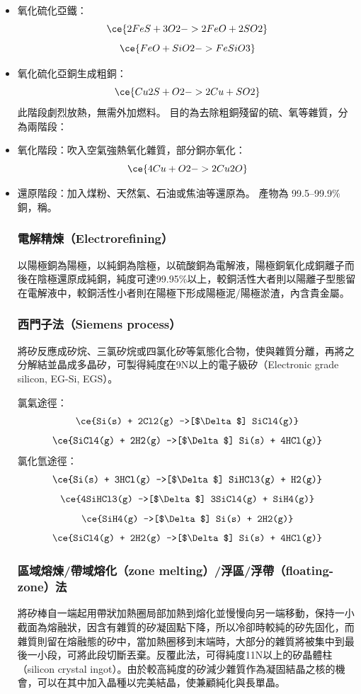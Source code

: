 \documentclass[a4paper,12pt]{report}
\begin{document}
\begin{itemize}
\begin{itemize}
在轉爐中吹入空氣強熱氧化冰銅，得到含 97–99\% 銅的與爐渣，反應有兩階段：
\ben
\item 氧化硫化亞鐵：
\[\ce{2FeS + 3O2 -> 2FeO + 2SO2}\]
\[\ce{FeO + SiO2 -> FeSiO3}\]
\item 氧化硫化亞銅生成粗銅：  
\[\ce{Cu2S + O2 -> 2Cu + SO2}\]
此階段劇烈放熱，無需外加燃料。
\een
{}
目的為去除粗銅殘留的硫、氧等雜質，分為兩階段：
\ben
\item 氧化階段：吹入空氣強熱氧化雜質，部分銅亦氧化：
\[\ce{4Cu + O2 -> 2Cu2O}\]
\item 還原階段：加入煤粉、天然氣、石油或焦油等還原為。
\een
產物為 99.5–99.9\% 銅，稱。
\subsubsection{電解精煉（Electrorefining）}
以陽極銅為陽極，以純銅為陰極，以硫酸銅為電解液，陽極銅氧化成銅離子而後在陰極還原成純銅，純度可達99.95\%以上，較銅活性大者則以陽離子型態留在電解液中，較銅活性小者則在陽極下形成陽極泥/陽極淤渣，內含貴金屬。
\subsubsection{西門子法（Siemens process）}
將矽反應成矽烷、三氯矽烷或四氯化矽等氣態化合物，使與雜質分離，再將之分解結並晶成多晶矽，可製得純度在9N以上的電子級矽（Electronic grade silicon, EG-Si, EGS）。

氯氣途徑：
\[\ce{Si(s) + 2Cl2(g) ->[$\Delta$] SiCl4(g)}\]
\[\ce{SiCl4(g) + 2H2(g) ->[$\Delta$] Si(s) + 4HCl(g)}\]
氯化氫途徑：
\[\ce{Si(s) + 3HCl(g) ->[$\Delta$] SiHCl3(g) + H2(g)}\]
\[\ce{4SiHCl3(g) ->[$\Delta$] 3SiCl4(g) + SiH4(g)}\]
\[\ce{SiH4(g) ->[$\Delta$] Si(s) + 2H2(g)}\]
\[\ce{SiCl4(g) + 2H2(g) ->[$\Delta$] Si(s) + 4HCl(g)}\]
\subsubsection{區域熔煉/帶域熔化（zone melting）/浮區/浮帶（floating-zone）法}
將矽棒自一端起用帶狀加熱圈局部加熱到熔化並慢慢向另一端移動，保持一小截面為熔融狀，因含有雜質的矽凝固點下降，所以冷卻時較純的矽先固化，而雜質則留在熔融態的矽中，當加熱圈移到末端時，大部分的雜質將被集中到最後一小段，可將此段切斷丟棄。反覆此法，可得純度11N以上的矽晶體柱（silicon crystal ingot）。由於較高純度的矽減少雜質作為凝固結晶之核的機會，可以在其中加入晶種以完美結晶，使兼顧純化與長單晶。

\end{itemize}
\end{itemize}
\end{document}
